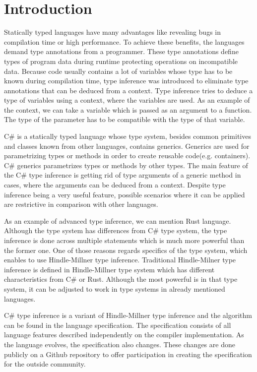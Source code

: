 \chapter*{Introduction}

Statically typed languages have many advantages like revealing bugs in compilation time or high performance.
To achieve these benefits, the languages demand type annotations from a programmer.
These type annotations define types of program data during runtime protecting operations on incompatible data.
Because code usually contains a lot of variables whose type has to be known during compilation time, type inference was introduced to eliminate type annotations that can be deduced from a context.
Type inference tries to deduce a type of variables using a context, where the variables are used.
As an example of the context, we can take a variable which is passed as an argument to a function. 
The type of the parameter has to be compatible with the type of that variable.

C\# is a statically typed language whose type system, besides common primitives and classes known from other languages, contains generics.
Generics are used for parametrizing types or methods in order to create reusable code(e.g. containers).
C\# generics parametrizes types or methods by other types.
The main feature of the C\# type inference is getting rid of type arguments of a generic method in cases, where the arguments can be deduced from a context.
Despite type inference being a very useful feature, possible scenarios where it can be applied are restrictive in comparison with other languages.

As an example of advanced type inference, we can mention Rust language.
Although the type system has differences from C\# type system, the type inference is done across multiple statements which is much more powerful than the former one.
One of those reasons regards specifics of the type system, which enables to use Hindle-Millner type inference.
Traditional Hindle-Milner type inference is defined in Hindle-Millner type system which has different characteristics from C\# or Rust.
Although the most powerful is in that type system, it can be adjusted to work in type systems in already mentioned languages.

C\# type inference is a variant of Hindle-Millner type inference and the algorithm can be found in the language specification.
The specification consists of all language features described independently on the compiler implementation.
As the language evolves, the specification also changes.
These changes are done publicly on a Github repository to offer participation in creating the specification for the outside community.

